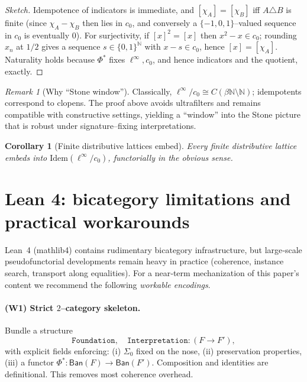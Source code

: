 \documentclass[11pt]{article}
\newtheorem{corollary}[theorem]{Corollary}
\theoremstyle{definition}
\theoremstyle{remark}
\newtheorem{remark}[theorem]{Remark}
\newcommand{\N}{\mathbb{N}}
\newcommand{\cnull}{c_0}
\newcommand{\linf}{\ell^\infty}
\newcommand{\Ban}{\mathsf{Ban}}
\newcommand{\SigmaZero}{\Sigma_{0}}
\begin{document}
\begin{proof}[Sketch]
Idempotence of indicators is immediate, and \([\chi_A]=[\chi_B]\) iff \(A\triangle B\) is finite (since \(\chi_A-\chi_B\) then lies in \(\cnull\), and conversely a $\{-1,0,1\}$--valued sequence in \(\cnull\) is eventually $0$). For surjectivity, if \([x]^2=[x]\) then \(x^2-x\in\cnull\); rounding $x_n$ at \(1/2\) gives a sequence \(s\in\{0,1\}^\N\) with \(x-s\in\cnull\), hence \([x]=[\chi_A]\). Naturality holds because \(\Phi^*\) fixes \(\linf,\cnull\), and hence indicators and the quotient, exactly.
\end{proof}

\begin{remark}[Why ``Stone window'']
Classically, \(\linf/\cnull\cong C(\beta\N\setminus\N)\); idempotents correspond to clopens. The proof above avoids ultrafilters and remains compatible with constructive settings, yielding a ``window'' into the Stone picture that is robust under signature--fixing interpretations.
\end{remark}

\begin{corollary}[Finite distributive lattices embed]
Every finite distributive lattice embeds into \(\mathrm{Idem}(\linf/\cnull)\), functorially in the obvious sense. 
\end{corollary}

\section{Lean 4: bicategory limitations and practical workarounds}\label{sec:lean}

Lean~4 (mathlib4) contains rudimentary bicategory infrastructure, but large‑scale pseudofunctorial developments remain heavy in practice (coherence, instance search, transport along equalities). For a near‑term mechanization of this paper’s content we recommend the following \emph{workable encodings}.

\paragraph{(W1) Strict $2$--category skeleton.}
Bundle a structure
\[
  \texttt{Foundation},\quad \texttt{Interpretation}:(F\to F'),
\]
with explicit fields enforcing: (i) \(\SigmaZero\) fixed on the nose, (ii) preservation properties, (iii) a functor \(\Phi^*:\Ban(F)\to\Ban(F')\). Composition and identities are definitional. This removes most coherence overhead.
\end{document}

